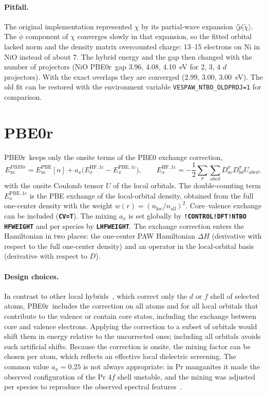 \documentclass[11pt,a4paper,oneside]{book}
\newcommand{\onec}{\mathrm{1c}}
\newcommand{\pbezero}{PBE0r}
\newcommand{\key}[1]{\textbf{\texttt{#1}}}
\newcommand{\braket}[2]{\langle #1|#2\rangle}
\newcommand{\pt}{\tilde p}
\begin{document}
\paragraph{Pitfall.} The original implementation represented $\chi$ by
its partial-wave expansion $\braket{\pt}{\tilde\chi}$. The $\dot\phi$
component of $\chi$ converges slowly in that expansion, so the fitted
orbital lacked norm and the density matrix overcounted charge: 13--15
electrons on Ni in NiO instead of about 7. The hybrid energy and the gap
then changed with the number of projectors (NiO \pbezero\ gap 3.96,
4.08, 4.10~eV for 2, 3, 4 $d$ projectors). With the exact overlaps they
are converged (2.99, 3.00, 3.00~eV). The old fit can be restored with the
environment variable \texttt{VESPAW\_NTBO\_OLDPROJ=1} for comparison.

\section{\pbezero}\label{sec:pbe0r}

\pbezero\ keeps only the onsite terms of the PBE0 exchange correction,
\begin{equation}
  E_{\mathrm{xc}}^{\pbezero} = E_{\mathrm{xc}}^{\mathrm{PBE}}[n]
  + a_x\bigl(E_x^{\mathrm{HF},\onec} - E_x^{\mathrm{PBE},\onec}\bigr),
  \qquad
  E_x^{\mathrm{HF},\onec} = -\frac12\sum_\sigma\sum_{abcd}
  D_{ac}^\sigma D_{bd}^\sigma U_{abcd},
  \label{eq:pbe0r}
\end{equation}
with the onsite Coulomb tensor $U$ of the local orbitals. The
double-counting term $E_x^{\mathrm{PBE},\onec}$ is the PBE exchange of the
local-orbital density, obtained from the full one-center density with the
weight $w(r)=(n_{\mathrm{loc}}/n_{\mathrm{all}})^2$. Core--valence exchange
can be included (\key{CV=T}). The mixing $a_x$ is set globally by
\key{!CONTROL!DFT!NTBO HFWEIGHT} and per species by \key{LHFWEIGHT}. The
exchange correction enters the Hamiltonian in two places: the one-center
PAW Hamiltonian $\Delta H$ (derivative with respect to the full one-center
density) and an operator in the local-orbital basis (derivative with
respect to $D$).

\paragraph{Design choices.} In contrast to other local
hybrids~\cite{novak06_pssb243_563,tran06_prb74_155108}, which correct
only the $d$ or $f$ shell of selected atoms, \pbezero\ includes the
correction on all atoms and for all local orbitals that contribute to
the valence or contain core states, including the exchange between
core and valence electrons. Applying the correction to a subset of
orbitals would shift them in energy relative to the uncorrected ones;
including all orbitals avoids such artificial shifts. Because the
correction is onsite, the mixing factor can be chosen per atom, which
reflects an effective local dielectric screening. The common value
$a_x=0.25$ is not always appropriate: in Pr manganites it made the
observed configuration of the Pr $4f$ shell unstable, and the mixing
was adjusted per species to reproduce the observed spectral
features~\cite{sotoudeh17_prb95_235150}.
\end{document}
